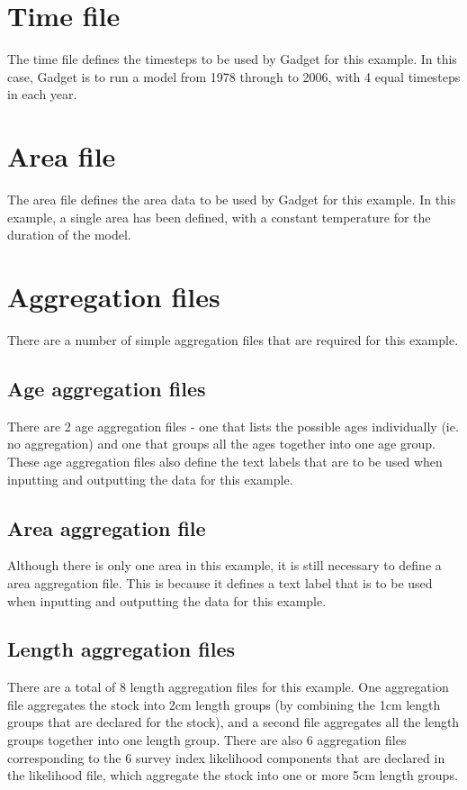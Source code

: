 \documentclass[10pt,titlepage]{article}
\begin{document}
\section{Time file}
The time file defines the timesteps to be used by Gadget for this example.  In this case, Gadget is to run a model from 1978 through to 2006, with 4 equal timesteps in each year.

{\small }

\section{Area file}
The area file defines the area data to be used by Gadget for this example.  In this example, a single area has been defined, with a constant temperature for the duration of the model.

{\small }

\section{Aggregation files}
There are a number of simple aggregation files that are required for this example.

\subsection{Age aggregation files}
There are 2 age aggregation files - one that lists the possible ages individually (ie. no aggregation) and one that groups all the ages together into one age group.  These age aggregation files also define the text labels that are to be used when inputting and outputting the data for this example.

{\small }
{\small }

\subsection{Area aggregation file}
Although there is only one area in this example, it is still necessary to define a area aggregation file.  This is because it defines a text label that is to be used when inputting and outputting the data for this example.

{\small }

\subsection{Length aggregation files}
There are a total of 8 length aggregation files for this example.  One aggregation file aggregates the stock into 2cm length groups (by combining the 1cm length groups that are declared for the stock), and a second file aggregates all the length groups together into one length group.  There are also 6 aggregation files corresponding to the 6 survey index likelihood components that are declared in the likelihood file, which aggregate the stock into one or more 5cm length groups.
\end{document}
